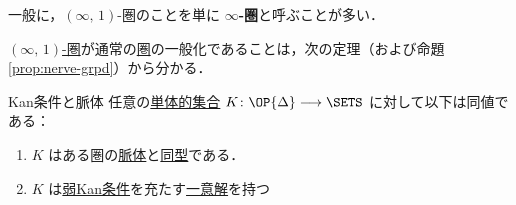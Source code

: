 \documentclass[TQFT_main]{subfiles}
\begin{document}
\begin{marker}
    一般に，$(\infty,\, 1)$-圏のことを単に $\bm{\infty}$\textbf{-圏}と呼ぶことが多い．
\end{marker}

\hyperref[def:infinity-1]{$(\infty,\, 1)$-圏}が通常の\hyperref[def:category]{圏}の一般化であることは，次の定理（および命題\ref{prop:nerve-grpd}）から分かる．

\begin{mytheo}[label=thm:KanCplx]{Kan条件と脈体}
    任意の\hyperref[def:SimpSet]{単体的集合} $K \colon \OP{\Delta} \lto \SETS$ に対して以下は同値である：
    \begin{enumerate}
        \item $K$ はある圏の\hyperref[def:nerve]{脈体}と\hyperref[def:iso]{同型}である．
        \item $K$ は\hyperref[def:KanCplx]{弱Kan条件}を充たす\underline{一意解}を持つ
    \end{enumerate}
\end{mytheo}
\end{document}
